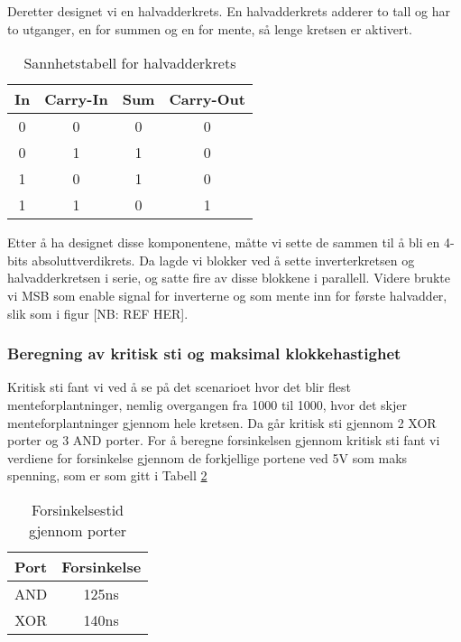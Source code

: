 
Deretter designet vi en halvadderkrets. En halvadderkrets adderer to tall og har to utganger, en for summen og en for mente, så lenge kretsen er aktivert.

\begin{table}[h]
  \centering
  \begin{tabular}{c c|c|c}

    In & Carry-In & Sum & Carry-Out\\
    \hline
    0 & 0 & 0 & 0\\
    0 & 1 & 1 & 0\\
    1 & 0 & 1 & 0\\
    1 & 1 & 0 & 1\\

  \end{tabular}
  \caption{Sannhetstabell for halvadderkrets}
  \label{tabell:2}
\end{table}


Etter å ha designet disse komponentene, måtte vi sette de sammen til å bli en 4-bits absoluttverdikrets.
Da lagde vi blokker ved å sette inverterkretsen og halvadderkretsen i serie, og satte fire av disse blokkene i parallell.
Videre brukte vi MSB som enable signal for inverterne og som mente inn for første halvadder, slik som i figur [NB: REF HER].

\subsubsection*{Beregning av kritisk sti og maksimal klokkehastighet}

Kritisk sti fant vi ved å se på det scenarioet hvor det blir flest menteforplantninger, nemlig overgangen fra 1000 til 1000, hvor det skjer menteforplantninger gjennom hele kretsen.
Da går kritisk sti gjennom 2 XOR porter og 3 AND porter.
For å beregne forsinkelsen gjennom kritisk sti fant vi verdiene for forsinkelse gjennom de forkjellige portene ved 5V som maks spenning, som er som gitt i Tabell \ref{tabell:3}

\begin{table}[h]
  \centering
  \begin{tabular}{c c}

    Port & Forsinkelse\\
    \hline
    AND & 125ns\\
    XOR & 140ns\\

  \end{tabular}
  \caption{Forsinkelsestid gjennom porter}
  \label{tabell:3}
\end{table}

